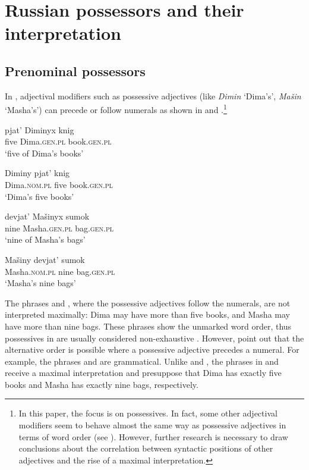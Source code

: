 \documentclass[output=paper,
colorlinks,
citecolor=brown,
newtxmath
]{langscibook}
\begin{document}
\section{Russian possessors and their interpretation}\label{FW}
\subsection{Prenominal possessors}\label{PreP}

In , adjectival modifiers such as possessive adjectives (like \textit{Dimin} `Dima's', \textit{Mašin} `Masha's') can precede or follow numerals as shown in  and .\footnote{In this paper, the focus is on possessives. In fact, some other adjectival modifiers seem to behave almost the same way as possessive adjectives in terms of word order (see ). However, further research is necessary to draw conclusions about the correlation between syntactic positions of other adjectives and the rise of a maximal interpretation.}

\ea\label{Num-Poss}
\ea\label{NumPoss} \gll pjat' Diminyx knig\\
five Dima.\textsc{gen.pl} book.\textsc{gen.pl}\\
\glt `five of Dima's books'

\ex\label{PossNum} \gll Diminy pjat' knig\\
Dima.\textsc{nom.pl} five book.\textsc{gen.pl}\\
\glt `Dima's five books' \hfill \citep[173]{Kagan.Pereltsvaig2012}
\z\z

\ea\label{Num-Poss2}
\ea\label{NumPoss2} \gll devjat' Mašinyx sumok\\
nine Masha.\textsc{gen.pl} bag.\textsc{gen.pl}\\
\glt `nine of Masha's bags'

\ex\label{PossNum2} \gll Mašiny devjat' sumok\\
Masha.\textsc{nom.pl} nine bag.\textsc{gen.pl}\\
\glt `Masha's nine bags'
\z\z

\noindent The phrases  and , where the possessive adjectives follow the numerals, are not interpreted maximally: Dima may have more than five books, and Masha may have more than nine bags. These phrases show the unmarked word order, thus possessives in  are usually considered non-exhaustive \citep[see, e.g.,][]{Partee2006}. However, \citet{Kagan.Pereltsvaig2012} point out that the alternative order is possible where a possessive adjective precedes a numeral. For example, the phrases  and  are grammatical. Unlike  and , the phrases in  and  receive a maximal interpretation and presuppose that Dima has exactly five books and Masha has exactly nine bags, respectively.
\end{document}
